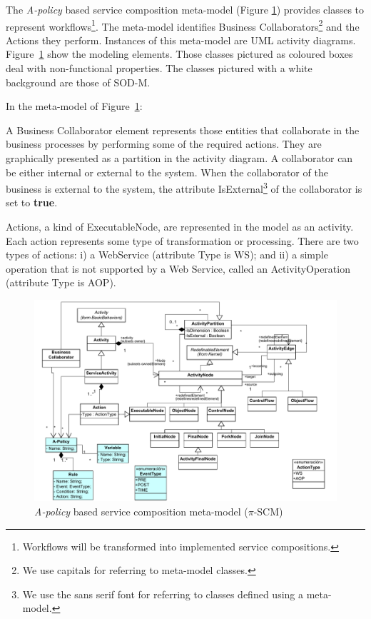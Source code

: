

The {\em A-policy} based service composition meta-model (Figure \ref{fig:e-scomposition-metamodel})
provides classes to represent workflows\footnote{Workflows will be transformed into implemented service compositions.}.
The meta-model identifies {\sc Business Collaborators}\footnote{We use {\sc capitals} for referring to meta-model classes.} and the {\sc Actions} they perform. 
Instances of this meta-model are UML activity diagrams. 
Figure~\ref{fig:e-scomposition-metamodel} show the modeling elements.
Those classes pictured as coloured boxes deal with non-functional properties.
The classes pictured with a white background are those of SOD-M.


In the meta-model of Figure~\ref{fig:e-scomposition-metamodel}:
\begin{itemizedTrivlist}
\item A {\sc Business Collaborator} element represents those entities that collaborate in the business processes by performing some of the required actions. 
They are graphically presented as a partition in the activity diagram. 
A collaborator can be either internal or external to the system. 
When the collaborator of the business is external to the system, the attribute {\sf IsExternal}\footnote{We use the {\sf sans serif} font for referring to classes defined using a meta-model.} of the collaborator is set to \textbf{true}.

\item {\sc Action}s, a kind of {\sc ExecutableNode}, are represented in the model as an activity. 
Each action represents some type of transformation or processing. 
There are two types of actions: i) a WebService (attribute Type is {\sf WS}); and ii) a simple operation that is not supported by a Web Service, called an {\sc ActivityOperation} (attribute Type is {\sc AOP}).
\begin{figure}[t]
\centering
\includegraphics[width=1.0\textwidth]{figs/E-service-composition-metamodel}
\caption{{\em A-policy} based service composition meta-model ($\pi$-SCM)}
\label{fig:e-scomposition-metamodel}
\end{figure}


\end{itemizedTrivlist}
